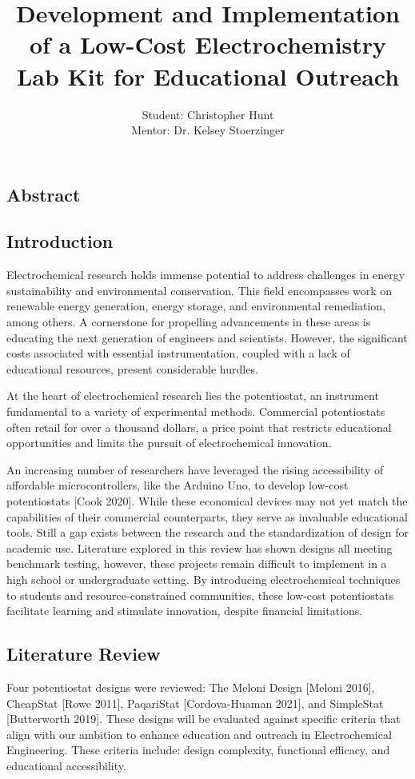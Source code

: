 \documentclass{article}
\title{\textcolor{mycolor}{\textbf{{\huge Development and Implementation of a Low-Cost Electrochemistry Lab Kit for Educational Outreach}}}}
\author{Student: Christopher Hunt \\ Mentor: Dr. Kelsey Stoerzinger}
\date{}
\begin{document}
\pagestyle{fancy}
\fancyhf{}
\rfoot{}
\rhead{\thepage}
\maketitle

\subsection*{Abstract}
\subsection*{Introduction}
Electrochemical research holds immense potential to address challenges in energy sustainability and environmental conservation. This field encompasses work on renewable energy generation, energy storage, and environmental remediation, among others. A cornerstone for propelling advancements in these areas is educating the next generation of engineers and scientists. However, the significant costs associated with essential instrumentation, coupled with a lack of educational resources, present considerable hurdles.

At the heart of electrochemical research lies the potentiostat, an instrument fundamental to a variety of experimental methods. Commercial potentiostats often retail for over a thousand dollars, a price point that restricts educational opportunities and limits the pursuit of electrochemical innovation.

An increasing number of researchers have leveraged the rising accessibility of affordable microcontrollers, like the Arduino Uno, to develop low-cost potentiostats [Cook 2020]. While these economical devices may not yet match the capabilities of their commercial counterparts, they serve as invaluable educational tools. Still a gap exists between the research and the standardization of design for academic use. Literature explored in this review has shown designs all meeting benchmark testing, however, these projects remain difficult to implement in a high school or undergraduate setting. By introducing electrochemical techniques to students and resource-constrained communities, these low-cost potentiostats facilitate learning and stimulate innovation, despite financial limitations.

\subsection*{Literature Review}
Four potentiostat designs were reviewed: The Meloni Design [Meloni 2016], CheapStat [Rowe 2011], PaqariStat [Cordova-Huaman 2021], and SimpleStat [Butterworth 2019]. These designs will be evaluated against specific criteria that align with our ambition to enhance education and outreach in Electrochemical Engineering. These criteria include: design complexity, functional efficacy, and educational accessibility.
\end{document}
